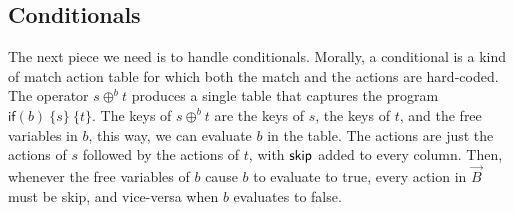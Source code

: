 \subsection{Conditionals}

The next piece we need is to handle conditionals. Morally, a
conditional is a kind of match action table for which both the match
and the actions are hard-coded.  The operator $s \oplus^b t$ produces
a single table that captures the program
$\mathsf{if}(b)~\{s\}~\{t\}$. The keys of $s \oplus^b t$ are the keys
of $s$, the keys of $t$, and the free variables in $b$, this way, we
can evaluate $b$ in the table.  The actions are just the actions of
$s$ followed by the actions of $t$, with $\mathsf{skip}$ added to every
column. Then, whenever the free variables of $b$ cause $b$ to evaluate
to true, every action in $\vec B$ must be skip, and vice-versa when
$b$ evaluates to false.



